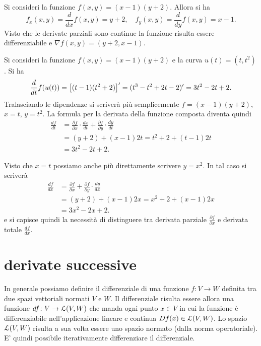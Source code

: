 \begin{example}
Si consideri la funzione $f(x,y) = (x-1)(y+2)$.
Allora si ha
\[
f_x(x,y) = \frac{d}{dx} f(x,y) = y + 2, 
\quad f_y(x,y) = \frac{d}{dy} f(x,y) = x - 1.
\]
Visto che le derivate parziali sono continue la funzione 
risulta essere differenziabile e $\nabla f(x,y) = (y+2,x-1)$.
\end{example}

\begin{example}
Si consideri la funzione $f(x,y) = (x-1)(y+2)$ 
e la curva $u(t) = (t, t^2)$.
Si ha 
\[
 \frac{d}{dt}f(u(t)) 
  = {\left[ (t-1)(t^2+2) \right]}'
  = (t^3 - t^2 + 2t - 2)'
  = 3t^2 - 2t + 2.
\]
Tralasciando le dipendenze si scriverà più semplicemente
$f = (x-1)(y+2)$, $x=t$, $y=t^2$.
La formula per la derivata della funzione composta
diventa quindi
\begin{align*}
  \frac{df}{dt} 
  &= \frac{\partial f}{\partial x}\cdot \frac{dx}{dt}
  + \frac{\partial f}{\partial y}\cdot \frac{dy}{dt} \\
  &= (y+2) + (x-1) 2t = t^2 + 2 + (t - 1)2t \\
  &= 3t^2 - 2t + 2. 
\end{align*}

Visto che $x=t$ possiamo anche più direttamente scrivere $y=x^2$.
In tal caso si scriverà
\begin{align*}
  \frac{df}{dx} 
  &= \frac{\partial f}{\partial x}
  + \frac{\partial f}{\partial y}\cdot \frac{dy}{dx} \\
  &= (y+2) + (x-1) 2x = x^2 + 2 + (x - 1)2x \\
  &= 3x^2 - 2x + 2.
\end{align*}
e si capisce quindi la necessità di distinguere tra derivata parziale 
$\frac{\partial f}{\partial x}$ e derivata totale $\frac{df}{dx}$.
\end{example}

\section{derivate successive}

In generale possiamo definire il differenziale di una funzione 
$f\colon V\to W$ definita tra due spazi vettoriali normati $V$ e $W$.
Il differenziale risulta essere allora 
una funzione $df\colon V \to \mathcal L(V,W)$ che manda 
ogni punto $x\in V$ in cui la funzione è differenziabile
nell'applicazione lineare e continua $Df(x) \in \mathcal L(V,W)$.
Lo spazio $\mathcal L(V,W)$ risulta a sua volta essere uno spazio normato
(dalla norma operatoriale). 
E' quindi possibile iterativamente differenziare il differenziale.


